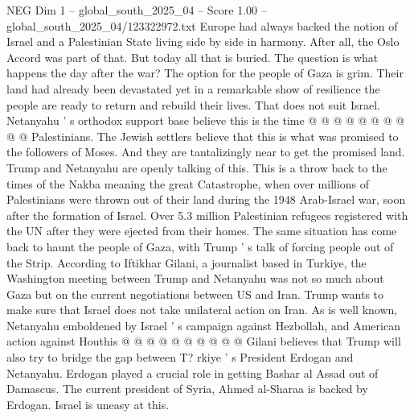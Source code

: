 \begin{textsample}{NEG Dim 1 – global\_south\_2025\_04 – Score 1.00 – global\_south\_2025\_04/123322972.txt}
Europe had always backed the notion of Israel and a Palestinian State living side by side in harmony.
After all, the Oslo Accord was part of that.
But today all that is buried.
The question is what happens the day after the war?
The option for the people of Gaza is grim.
Their land had already been devastated yet in a remarkable show of resilience the people are ready to return and rebuild their lives.
That does not suit Israel.
Netanyahu ' s orthodox support base believe this is the time @ @ @ @ @ @ @ @ @ @ Palestinians.
The Jewish settlers believe that this is what was promised to the followers of Moses.
And they are tantalizingly near to get the promised land.
Trump and Netanyahu are openly talking of this.
This is a throw back to the times of the Nakba meaning the great Catastrophe, when over millions of Palestinians were thrown out of their land during the 1948 Arab-Israel war, soon after the formation of Israel.
Over 5.3 million Palestinian refugees registered with the UN after they were ejected from their homes.
The same situation has come back to haunt the people of Gaza, with Trump ' s talk of forcing people out of the Strip.
According to Iftikhar Gilani, a journalist based in Turkiye, the Washington meeting between Trump and Netanyahu was not so much about Gaza but on the current negotiations between US and Iran.
Trump wants to make sure that Israel does not take unilateral action on Iran.
As is well known, Netanyahu emboldened by Israel ' s campaign against Hezbollah, and American action against Houthis @ @ @ @ @ @ @ @ @ @ Gilani believes that Trump will also try to bridge the gap between T? rkiye ' s President Erdogan and Netanyahu.
Erdogan played a crucial role in getting Bashar al Assad out of Damascus.
The current president of Syria, Ahmed al-Sharaa is backed by Erdogan.
Israel is uneasy at this.

\end{textsample}
